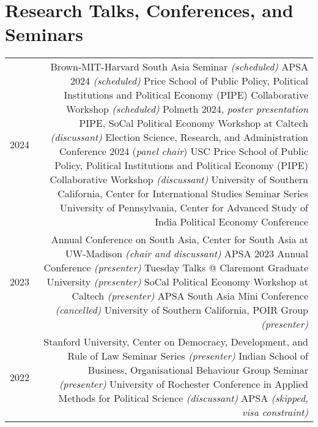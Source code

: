  \section*{Research Talks, Conferences, and Seminars}
 
 \begin{tabular}{L!{\VRule}R}
 	
 	2024 & Brown-MIT-Harvard South Asia Seminar \textit{(scheduled)} \newline 
 	APSA 2024 \textit{(scheduled)} \newline 
 	Price School of Public Policy, Political Institutions and Political Economy (PIPE) Collaborative Workshop \textit{(scheduled)} \newline 
 	Polmeth 2024, \textit{poster presentation} \newline
 	PIPE, SoCal Political Economy Workshop at Caltech \textit{(discussant)} \newline 
 Election Science, Research, and  Administration Conference 2024 (\textit{panel chair})\newline
 	USC Price School of Public Policy, Political Institutions and Political Economy (PIPE) Collaborative Workshop \textit{(discussant)} \newline 
 	University of Southern California, Center for International Studies Seminar Series \newline 
 	University of Pennsylvania, Center for Advanced Study of India Political Economy Conference \\
 	
 	2023 & Annual Conference on South Asia, Center for South Asia at UW-Madison \textit{(chair and discussant)} \newline 
 	APSA 2023 Annual Conference \textit{(presenter)} \newline 
 	Tuesday Talks @ Claremont Graduate University \textit{(presenter)} \newline 
 	SoCal Political Economy Workshop at Caltech \textit{(presenter)} \newline 
 	APSA South Asia Mini Conference \textit{(cancelled)} \newline 
 	University of Southern California, POIR Group \textit{(presenter)} \\
 	
 	2022 & Stanford University, Center on Democracy, Development, and Rule of Law Seminar Series \textit{(presenter)} \newline 
 	Indian School of Business, Organisational Behaviour Group Seminar \textit{(presenter)} \newline 
 	University of Rochester Conference in Applied Methods for Political Science \textit{(discussant)} \newline 
 	APSA \textit{(skipped, visa constraint)} \\
 	

\end{tabular}

